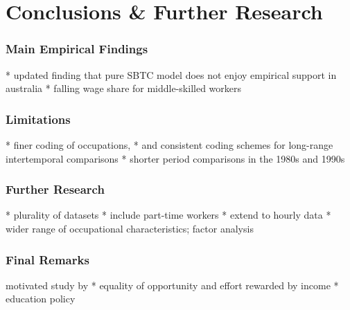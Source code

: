 \chapter{Conclusions \& Further Research}\label{ch:5}



\subsection{Main Empirical Findings}

* updated finding that pure SBTC model does not enjoy empirical support in australia
* falling wage share for middle-skilled workers

\subsection{Limitations}

* finer coding of occupations, 
* and consistent coding schemes for long-range intertemporal comparisons
* shorter period comparisons in the 1980s and 1990s

\subsection{Further Research}

* plurality of datasets
* include part-time workers
* extend to hourly data
* wider range of occupational characteristics; factor analysis

\subsection{Final Remarks}

motivated study by
* equality of opportunity and effort rewarded by income
* education policy



